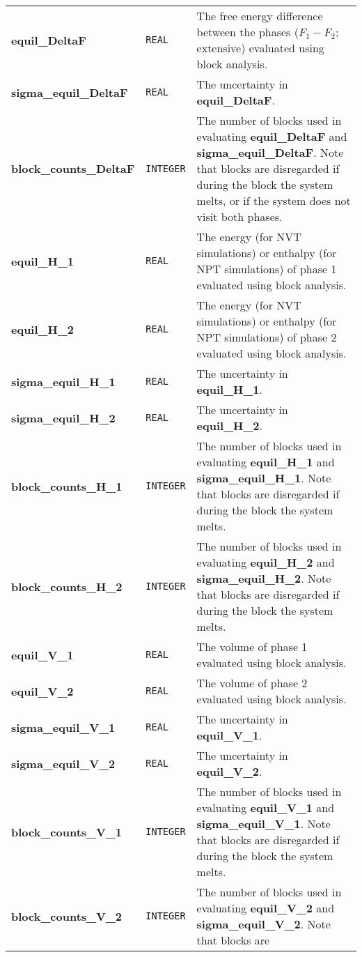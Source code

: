 \documentclass{report}
\begin{document}
\begin{landscape}
\begin{center}
\begin{longtable}{ l l p{8cm}}
\textbf{equil\_DeltaF} & \texttt{REAL} & The free energy difference between the phases ($F_1-F_2$; extensive) evaluated using block analysis.\\
\textbf{sigma\_equil\_DeltaF} & \texttt{REAL} & The uncertainty in \textbf{equil\_DeltaF}.\\
\textbf{block\_counts\_DeltaF} & \texttt{INTEGER} & The number of blocks used in evaluating \textbf{equil\_DeltaF} and \textbf{sigma\_equil\_DeltaF}. Note that
blocks are disregarded if during the block the system melts, or if the system does not visit both phases. \\
\textbf{equil\_H\_1} & \texttt{REAL} & The energy (for NVT simulations) or enthalpy (for NPT simulations) of phase 1 evaluated using block analysis.\\
\textbf{equil\_H\_2} & \texttt{REAL} & The energy (for NVT simulations) or enthalpy (for NPT simulations) of phase 2 evaluated using block analysis.\\
\textbf{sigma\_equil\_H\_1} & \texttt{REAL} & The uncertainty in \textbf{equil\_H\_1}.\\
\textbf{sigma\_equil\_H\_2} & \texttt{REAL} & The uncertainty in \textbf{equil\_H\_2}.\\
\textbf{block\_counts\_H\_1} & \texttt{INTEGER} & The number of blocks used in evaluating \textbf{equil\_H\_1} and \textbf{sigma\_equil\_H\_1}. Note that blocks are
disregarded if during the block the system melts. \\
\textbf{block\_counts\_H\_2} & \texttt{INTEGER} &  The number of blocks used in evaluating \textbf{equil\_H\_2} and \textbf{sigma\_equil\_H\_2}. Note that blocks are
disregarded if during the block the system melts. \\
\textbf{equil\_V\_1} & \texttt{REAL} & The volume of phase 1 evaluated using block analysis.\\
\textbf{equil\_V\_2} & \texttt{REAL} & The volume of phase 2 evaluated using block analysis.\\
\textbf{sigma\_equil\_V\_1} & \texttt{REAL} &  The uncertainty in \textbf{equil\_V\_1}.\\
\textbf{sigma\_equil\_V\_2} & \texttt{REAL} &  The uncertainty in \textbf{equil\_V\_2}.\\
\textbf{block\_counts\_V\_1} & \texttt{INTEGER} & The number of blocks used in evaluating \textbf{equil\_V\_1} and \textbf{sigma\_equil\_V\_1}. Note that blocks are
disregarded if during the block the system melts. \\
\textbf{block\_counts\_V\_2} & \texttt{INTEGER} &  The number of blocks used in evaluating \textbf{equil\_V\_2} and \textbf{sigma\_equil\_V\_2}. Note that blocks are

\end{longtable}
\end{center}
\end{landscape}
\end{document}
